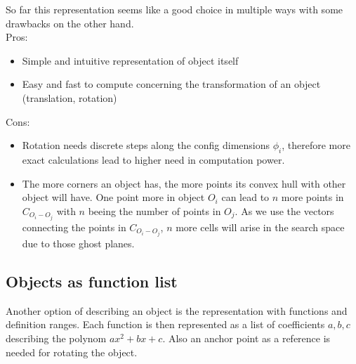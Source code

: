 So far this representation seems like a good choice in multiple ways with some drawbacks on the other hand.\\
Pros:
\begin{itemize}
\item Simple and intuitive representation of object itself
\item Easy and fast to compute concerning the transformation of an object (translation, rotation)
\end{itemize}
Cons:
\begin{itemize}
\item Rotation needs discrete steps along the config dimensions $\phi_i$, therefore more exact calculations lead to higher need in computation power.
\item The more corners an object has, the more points its convex hull with other object will have. One point more in object $O_i$ can lead to $n$ more points in $C_{O_i-O_j}$ with $n$ beeing the number of points in $O_j$. As we use the vectors connecting the points in $C_{O_i-O_j}$, $n$ more cells will arise in the search space due to those ghost planes.
\end{itemize}



\subsection{Objects as function list}
\label{subsec:functionlist}
Another option of describing an object is the representation with functions and definition ranges. Each function is then represented as a list of coefficients $a,b,c$ describing the polynom $ax^2 + bx + c$. Also an anchor point as a reference is needed for rotating the object.\\

